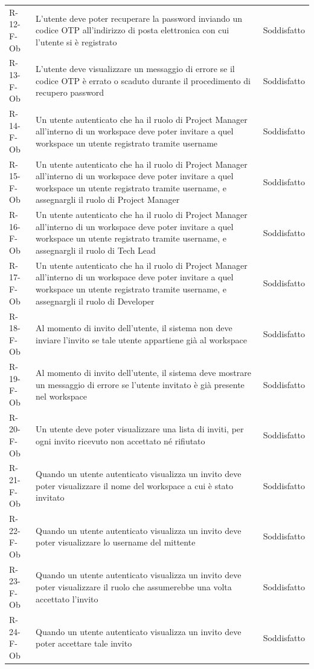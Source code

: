 \documentclass[a4paper, 11pt]{article}
\begin{document}
\begin{longtable}[c]{ >{\centering\arraybackslash}m{2.5cm} >{\centering\arraybackslash}m{8.3cm} >{\centering\arraybackslash}m{3.5cm} }
R-12-F-Ob & L’utente deve poter recuperare la password inviando un codice OTP all'indirizzo di posta elettronica con cui l'utente si è registrato & Soddisfatto\\
R-13-F-Ob & L'utente deve visualizzare un messaggio di errore se il codice OTP è errato o scaduto durante il procedimento di recupero password & Soddisfatto\\
R-14-F-Ob & Un utente autenticato che ha il ruolo di Project Manager all'interno di un workspace deve poter invitare a quel workspace un utente registrato tramite username & Soddisfatto\\
R-15-F-Ob & Un utente autenticato che ha il ruolo di Project Manager all'interno di un workspace deve poter invitare a quel workspace un utente registrato tramite username, e assegnargli il ruolo di Project Manager & Soddisfatto\\
R-16-F-Ob & Un utente autenticato che ha il ruolo di Project Manager all'interno di un workspace deve poter invitare a quel workspace un utente registrato tramite username, e assegnargli il ruolo di Tech Lead & Soddisfatto\\
R-17-F-Ob & Un utente autenticato che ha il ruolo di Project Manager all'interno di un workspace deve poter invitare a quel workspace un utente registrato tramite username, e assegnargli il ruolo di Developer & Soddisfatto\\
R-18-F-Ob & Al momento di invito dell'utente, il sistema non deve inviare l'invito se tale utente appartiene già al workspace & Soddisfatto\\
R-19-F-Ob & Al momento di invito dell'utente, il sistema deve mostrare un messaggio di errore se l'utente invitato è già presente nel workspace & Soddisfatto\\
R-20-F-Ob & Un utente deve poter visualizzare una lista di inviti, per ogni invito ricevuto non accettato né rifiutato & Soddisfatto\\
R-21-F-Ob & Quando un utente autenticato visualizza un invito deve poter visualizzare il nome del workspace a cui è stato invitato & Soddisfatto\\
R-22-F-Ob & Quando un utente autenticato visualizza un invito deve poter visualizzare lo username del mittente & Soddisfatto\\
R-23-F-Ob & Quando un utente autenticato visualizza un invito deve poter visualizzare il ruolo che assumerebbe una volta accettato l'invito & Soddisfatto\\
R-24-F-Ob & Quando un utente autenticato visualizza un invito deve poter accettare tale invito & Soddisfatto\\

\end{longtable}
\end{document}
